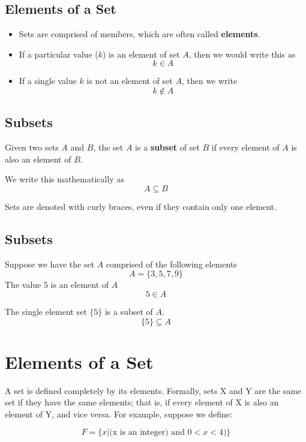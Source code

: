 \documentclass[12pt]{article}
\begin{document}
\subsection*{Elements of a Set}
\begin{itemize}
\item Sets are comprised of members, which are often called \textbf{elements}. 
\item If a particular value ($k$) is an element of set $A$, then we would write this as
\[k \in A \]

\item If a single value $k$ is not an element of set $A$, then we write
\[k \notin A \]
\end{itemize}

\subsection{Subsets}
Given two sets $A$ and $B$, the set $A$ is a \textbf{subset} of set $B$ if every element of $A$ is also an element of $B$. 


We write this mathematically as
\[A \subseteq B \]


\bigskip
Sets are denoted with curly braces, even if they contain only one element.


\subsection*{Subsets}
Suppose we have the set $A$ comprised of the following elements
\[ A =\{3,5,7,9\}\]
The value $5$ is an element of $A$
\[  5 \in A \]

The single element set $\{5\} $ is a subset of $A$.
\[ \{5\} \subseteq A\]

\section{Elements of a Set}

A set is defined completely by its elements. Formally, sets X and Y are the same set if they have the same elements; that is, if every element of X is also an element of Y, and vice versa. For example, suppose we define:

\[ F = \{x | \mbox{(x is an integer)} \mbox{ and } 0 < x < 4)\}  \]
\end{document}

